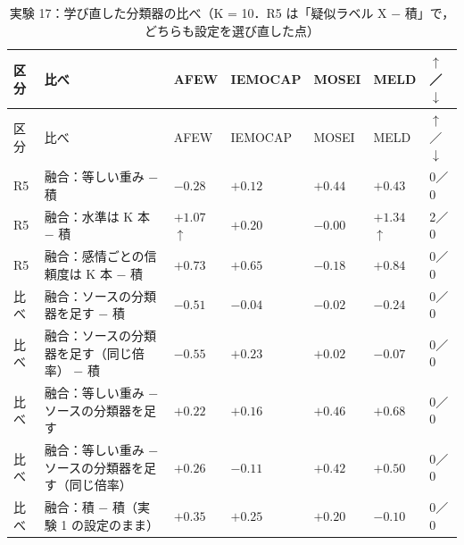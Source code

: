 \begin{longtable}{>{\raggedright}p{0.75cm}>{\raggedright}p{5.6cm}>{\raggedright}p{2.05cm}>{\raggedright}p{2.05cm}>{\raggedright}p{2.05cm}>{\raggedright}p{2.05cm}p{0.75cm}}
\caption{実験 17：学び直した分類器の比べ（K = 10．R5 は「疑似ラベル X − 積」で，どちらも設定を選び直した点）}\\
\toprule
区分 & 比べ & AFEW & IEMOCAP & MOSEI & MELD & $\uparrow$／$\downarrow$ \\
\midrule
\endfirsthead
\toprule
区分 & 比べ & AFEW & IEMOCAP & MOSEI & MELD & $\uparrow$／$\downarrow$ \\
\midrule
\endhead
\bottomrule
\endfoot

R5 & 融合：等しい重み − 積 & $-0.28$\newline{\tiny [$-$1.1, $+$0.5]} & $+0.12$\newline{\tiny [$-$1.3, $+$1.5]} & $+0.44$\newline{\tiny [$-$0.1, $+$1.0]} & $+0.43$\newline{\tiny [$-$0.3, $+$1.2]} & 0／0 \\
R5 & 融合：水準は K 本 − 積 & $+1.07$$\uparrow$\newline{\tiny [$+$0.5, $+$1.7]} & $+0.20$\newline{\tiny [$-$0.3, $+$0.7]} & $-0.00$\newline{\tiny [$-$0.4, $+$0.4]} & $+1.34$$\uparrow$\newline{\tiny [$+$0.6, $+$2.0]} & 2／0 \\
R5 & 融合：感情ごとの信頼度は K 本 − 積 & $+0.73$\newline{\tiny [$-$0.0, $+$1.5]} & $+0.65$\newline{\tiny [$-$0.3, $+$1.6]} & $-0.18$\newline{\tiny [$-$0.8, $+$0.5]} & $+0.84$\newline{\tiny [$+$0.2, $+$1.5]} & 0／0 \\
比べ & 融合：ソースの分類器を足す − 積 & $-0.51$ & $-0.04$ & $-0.02$ & $-0.24$ & 0／0 \\
比べ & 融合：ソースの分類器を足す（同じ倍率） − 積 & $-0.55$ & $+0.23$ & $+0.02$ & $-0.07$ & 0／0 \\
比べ & 融合：等しい重み − ソースの分類器を足す & $+0.22$ & $+0.16$ & $+0.46$ & $+0.68$ & 0／0 \\
比べ & 融合：等しい重み − ソースの分類器を足す（同じ倍率） & $+0.26$ & $-0.11$ & $+0.42$ & $+0.50$ & 0／0 \\
比べ & 融合：積 − 積（実験 1 の設定のまま） & $+0.35$ & $+0.25$ & $+0.20$ & $-0.10$ & 0／0 \\

\end{longtable}
